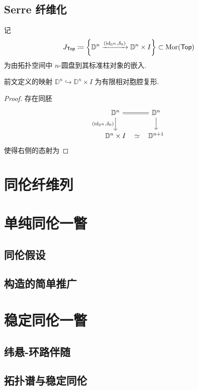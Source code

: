\subsection{Serre 纤维化}
\begin{definition}
    记
    \[
    J_{\mathsf{Top}} \coloneqq \left\{\mathbb{D}^n \xrightarrow{(\mathrm{id}_{\mathbb{D}^n},\delta_0)} \mathbb{D}^n \times I\right\}\subset \operatorname{Mor}(\mathsf{Top})
    \]
    为由拓扑空间中 $n$-圆盘到其标准柱对象的嵌入.
\end{definition}
\begin{lemma}
    前文定义的映射 $\mathbb{D}^n \hookrightarrow \mathbb{D}^n \times I$ 为有限相对胞腔复形.
\end{lemma}
\begin{proof}
    存在同胚
    \[\begin{tikzcd}
	{\mathbb{D}^n} & {\mathbb{D}^n} \\
	{\mathbb{D}^n\times I} & {\mathbb{D}^{n+1}}
	\arrow[equal,from=1-1, to=1-2]
	\arrow["{(\identity_{\mathbb{D}^n},\delta_0)}"', from=1-1, to=2-1]
	\arrow[from=1-2, to=2-2]
	\arrow["\simeq"{marking, allow upside down}, draw=none, from=2-1, to=2-2]
    \end{tikzcd}\]
    使得右侧的态射为
\end{proof}
\section{同伦纤维列}
\section{单纯同伦一瞥}
\subsection{同伦假设}
\subsection{构造的简单推广}
\section{稳定同伦一瞥}
\subsection{纬悬-环路伴随}
\subsection{拓扑谱与稳定同伦}